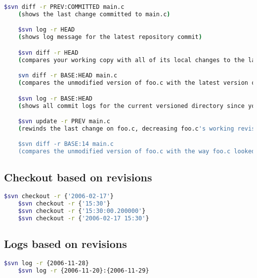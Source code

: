 \documentclass{article}
\begin{document}
\begin{lstlisting}[language=BASH]
    $svn diff -r PREV:COMMITTED main.c
    (shows the last change committed to main.c)

    $svn log -r HEAD
    (shows log message for the latest repository commit)

    $svn diff -r HEAD
    (compares your working copy with all of its local changes to the latest version of that tree in the repository)

    svn diff -r BASE:HEAD main.c
    (compares the unmodified version of foo.c with the latest version of foo.c in the repository)

    $svn log -r BASE:HEAD
    (shows all commit logs for the current versioned directory since you last updated

    $svn update -r PREV main.c
    (rewinds the last change on foo.c, decreasing foo.c's working revision)

    $svn diff -r BASE:14 main.c
    (compares the unmodified version of foo.c with the way foo.c looked in revision 14) 
\end{lstlisting}

\subsection{Checkout based on revisions}

\begin{lstlisting}[language=BASH]
    $svn checkout -r {'2006-02-17'}
    $svn checkout -r {'15:30'}
    $svn checkout -r {'15:30:00.200000'}
    $svn checkout -r {'2006-02-17 15:30'}
\end{lstlisting}

\subsection{Logs based on revisions}
\begin{lstlisting}[language=BASH]
    $svn log -r {2006-11-28}
    $svn log -r {2006-11-20}:{2006-11-29} 
\end{lstlisting}
\end{document}
